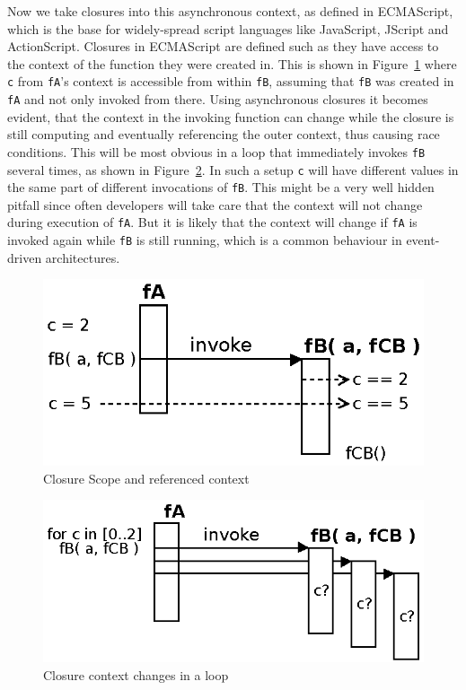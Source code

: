 Now we take closures into this asynchronous context, as defined in ECMAScript\cite{EcmaScript}, which is the base for widely-spread script languages like JavaScript, JScript and ActionScript.
Closures in ECMAScript\cite{EcmaScript} are defined such as they have access to the context of the function they were created in.
This is shown in Figure~\ref{fig:Closures_Closure-1} where \texttt{c} from \texttt{fA}'s context is accessible from within \texttt{fB}, assuming that \texttt{fB} was created in \texttt{fA} and not only invoked from there.
Using asynchronous closures it becomes evident, that the context in the invoking function can change while the closure is still computing and eventually referencing the outer context, thus causing race conditions.
This will be most obvious in a loop that immediately invokes \texttt{fB} several times, as shown in Figure~\ref{fig:Closures_Closure-2}.
In such a setup \texttt{c} will have different values in the same part of different invocations of \texttt{fB}.
This might be a very well hidden pitfall since often developers will take care that the context will not change during execution of \texttt{fA}.
But it is likely that the context will change if \texttt{fA} is invoked again while \texttt{fB} is still running, which is a common behaviour in event-driven architectures.
\begin{figure}[!ht]
	\centering
  \includegraphics{figures/Closures_Closure-1}
	\caption{Closure Scope and referenced context}
	\label{fig:Closures_Closure-1}
\end{figure}
\begin{figure}[!ht]
	\centering
  \includegraphics{figures/Closures_Closure-2}
	\caption{Closure context changes in a loop}
	\label{fig:Closures_Closure-2}
\end{figure}


